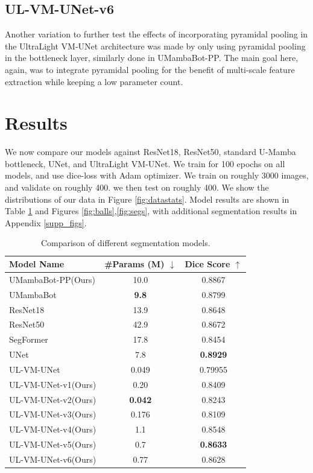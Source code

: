 \documentclass[conference]{IEEEtran}
\begin{document}
\subsection{UL-VM-UNet-v6}
Another variation to further test the effects of incorporating pyramidal pooling in the UltraLight VM-UNet architecture was made by only using pyramidal pooling in the bottleneck layer, similarly done in UMambaBot-PP. The main goal here, again, was to integrate pyramidal pooling for the benefit of multi-scale feature extraction while keeping a low parameter count.


\section{Results}
We now compare our models against ResNet18, ResNet50, standard U-Mamba bottleneck, UNet, and UltraLight VM-UNet. We train for 100 epochs on all models, and use dice-loss with Adam optimizer. We train on roughly 3000 images, and validate on roughly 400. we then test on roughly 400. We show the distributions of our data in Figure \ref{fig:datastats}.
Model results are shown in Table \ref{tab:model_comparison} and Figures \ref{fig:balls},\ref{fig:segs}, with additional segmentation results in Appendix \ref{supp_figs}.


\renewcommand{\arraystretch}{1.25}
\begin{table}[ht]
    \centering
    \captionsetup{skip=6pt}
    \begin{tabular}{|l|c|c|}
        \hline
        \textbf{Model Name} & \textbf{\#Params (M) $\downarrow$} & \textbf{Dice Score $\uparrow$} \\
        \hline
        UMambaBot-PP(Ours) & 10.0 & 0.8867 \\
        UMambaBot & \textbf{9.8} & 0.8799 \\
        ResNet18 & 13.9 & 0.8648 \\
        ResNet50 & 42.9 & 0.8672 \\
        SegFormer & 17.8 & 0.8454 \\
        UNet & 7.8 & \textbf{0.8929} \\
        \hline\hline
        UL-VM-UNet & 0.049 & 0.79955 \\
        UL-VM-UNet-v1(Ours) & 0.20 & 0.8409 \\
        UL-VM-UNet-v2(Ours) & \textbf{0.042} & 0.8243 \\
        UL-VM-UNet-v3(Ours) & 0.176 & 0.8109 \\
        UL-VM-UNet-v4(Ours) & 1.1 & 0.8548 \\
        UL-VM-UNet-v5(Ours) & 0.7 & \textbf{0.8633} \\
        UL-VM-UNet-v6(Ours) & 0.77 & 0.8628 \\
        \hline
    \end{tabular}
    \caption{Comparison of different segmentation models.}
    \label{tab:model_comparison}
\end{table}
\end{document}
